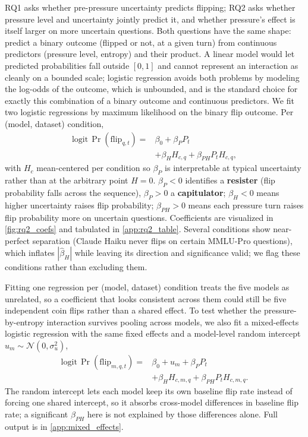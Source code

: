 RQ1 asks whether pre-pressure uncertainty predicts flipping; RQ2 asks whether pressure level and uncertainty jointly predict it, and whether pressure's effect is itself larger on more uncertain questions. Both questions have the same shape: predict a binary outcome (flipped or not, at a given turn) from continuous predictors (pressure level, entropy) and their product. A linear model would let predicted probabilities fall outside $[0,1]$ and cannot represent an interaction as cleanly on a bounded scale; logistic regression avoids both problems by modeling the log-odds of the outcome, which is unbounded, and is the standard choice for exactly this combination of a binary outcome and continuous predictors. We fit two logistic regressions by maximum likelihood on the binary flip outcome. Per (model, dataset) condition,
\[
\begin{aligned}
\mathrm{logit}\,\Pr(\mathrm{flip}_{q,t}) ={}& \beta_0 + \beta_P P_t \\
& + \beta_H H_{c,q} + \beta_{PH} P_t H_{c,q},
\end{aligned}
\]
with $H_c$ mean-centered per condition so $\beta_P$ is interpretable at typical uncertainty rather than at the arbitrary point $H=0$. $\beta_P<0$ identifies a \textbf{resister} (flip probability falls across the sequence), $\beta_P>0$ a \textbf{capitulator}; $\beta_H<0$ means higher uncertainty raises flip probability; $\beta_{PH}>0$ means each pressure turn raises flip probability more on uncertain questions. Coefficients are visualized in \autoref{fig:rq2_coefs} and tabulated in \autoref{app:rq2_table}. Several conditions show near-perfect separation (Claude Haiku never flips on certain MMLU-Pro questions), which inflates $|\hat\beta_H|$ while leaving its direction and significance valid; we flag these conditions rather than excluding them.

Fitting one regression per (model, dataset) condition treats the five models as unrelated, so a coefficient that looks consistent across them could still be five independent coin flips rather than a shared effect. To test whether the pressure-by-entropy interaction survives pooling across models, we also fit a mixed-effects logistic regression with the same fixed effects and a model-level random intercept $u_m \sim \mathcal{N}(0,\sigma_u^2)$,
\[
\begin{aligned}
\mathrm{logit}\,\Pr(\mathrm{flip}_{m,q,t}) ={}& \beta_0 + u_m + \beta_P P_t \\
& + \beta_H H_{c,m,q} + \beta_{PH} P_t H_{c,m,q}.
\end{aligned}
\]
The random intercept lets each model keep its own baseline flip rate instead of forcing one shared intercept, so it absorbs cross-model differences in baseline flip rate; a significant $\beta_{PH}$ here is not explained by those differences alone. Full output is in \autoref{app:mixed_effects}.

